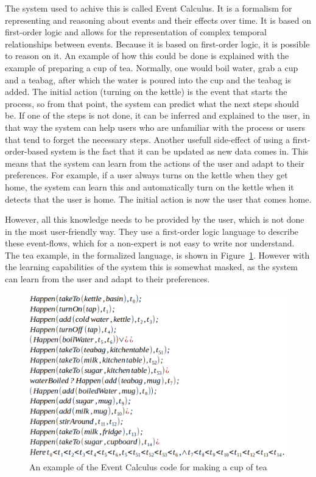 \documentclass[11pt,a4paper]{report}
\begin{document}
The system used to achive this is called Event Calculus. It is a formalism for representing and reasoning about events and their effects over time. It is based on first-order logic and allows for the representation of complex temporal relationships between events. Because it is based on first-order logic, it is possible to reason on it. An example of how this could be done is explained with the example of preparing a cup of tea. Normally, one would boil water, grab a cup and a teabag, after which the water is poured into the cup and the teabag is added. The initial action (turning on the kettle) is the event that starts the process, so from that point, the system can predict what the next steps should be. If one of the steps is not done, it can be inferred and explained to the user, in that way the system can help users who are unfamiliar with the process or users that tend to forget the necessary steps. Another usefull side-effect of using a first-order-based system is the fact that it can be updated as new data comes in. This means that the system can learn from the actions of the user and adapt to their preferences. For example, if a user always turns on the kettle when they get home, the system can learn this and automatically turn on the kettle when it detects that the user is home. The initial action is now the user that comes home.

However, all this knowledge needs to be provided by the user, which is not done in the most user-friendly way. They use a first-order logic language to describe these event-flows, which for a non-expert is not easy to write nor understand. The tea example, in the formalized language, is shown in Figure~\ref{fig:event_code}. However with the learning capabilities of the system this is somewhat masked, as the system can learn from the user and adapt to their preferences.
\begin{figure}
    \centering
    \includegraphics[width=0.8\linewidth]{images/event_code.png}
    \caption{An example of the Event Calculus code for making a cup of tea~\cite{SOTA_EventCalculus}}
    \label{fig:event_code}
\end{figure}
\end{document}
